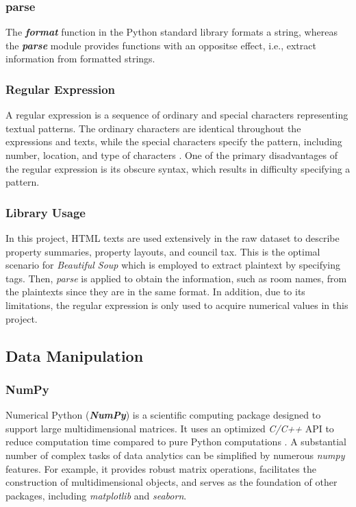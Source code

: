 \documentclass[12pt,twoside]{report}
\begin{document}
\subsubsection{parse}
The \textit{\textbf{format}} function in the Python standard library formats a string, whereas the \textit{\textbf{parse}} module provides functions with an oppositse effect, i.e., extract information from formatted strings.

\subsubsection{Regular Expression}
A regular expression is a sequence of ordinary and special characters representing textual patterns. The ordinary characters are identical throughout the expressions and texts, while the special characters specify the pattern, including number, location, and type of characters  \citep{RN14}. One of the primary disadvantages of the regular expression is its obscure syntax, which results in difficulty specifying a pattern. 

\subsubsection{Library Usage}
In this project, HTML texts are used extensively in the raw dataset to describe property summaries, property layouts, and council tax. This is the optimal scenario for \textit{Beautiful Soup} which is employed to extract plaintext by specifying tags. Then, \textit{parse} is applied to obtain the information, such as room names, from the plaintexts since they are in the same format. In addition, due to its limitations, the regular expression is only used to acquire numerical values in this project. 


\subsection{Data Manipulation}
\subsubsection{NumPy}
Numerical Python (\textit{\textbf{NumPy}}) is a scientific computing package designed to support large multidimensional matrices. It uses an optimized \textit{C/C++} API to reduce computation time compared to pure Python computations \citep{RN6}. A substantial number of complex tasks of data analytics can be simplified by numerous \textit{numpy} features. For example, it provides robust matrix operations, facilitates the construction of multidimensional objects, and serves as the foundation of other packages, including \textit{matplotlib} and \textit{seaborn}.
\end{document}
